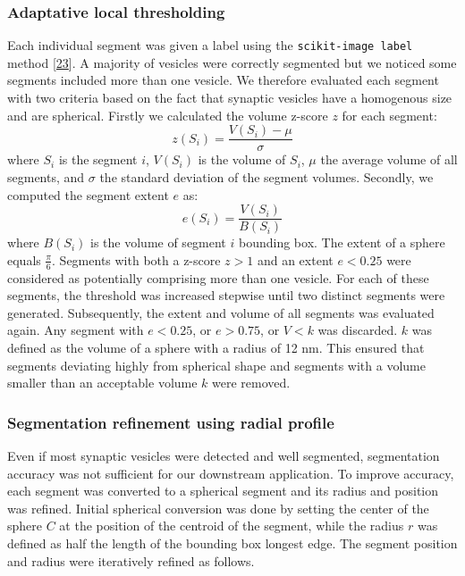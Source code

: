 \hypertarget{adaptative-local-thresholding}{%
\subsubsection{Adaptative local thresholding}\label{adaptative-local-thresholding}}

Each individual segment was given a label using the \texttt{scikit-image\ label} method {[}\protect\hyperlink{ref-stvWEJeu}{23}{]}.
A majority of vesicles were correctly segmented but we noticed some segments included more than one vesicle.
We therefore evaluated each segment with two criteria based on the fact that synaptic vesicles have a homogenous size and are spherical.
Firstly we calculated the volume z-score \(z\) for each segment:
\begin{equation}z(S_i) = \frac{V(S_i) - \mu}{\sigma}\label{eq:z-score-volume}\end{equation}
where \(S_i\) is the segment \(i\), \(V(S_i)\) is the volume of \(S_i\), \(\mu\) the average volume of all segments, and \(\sigma\) the standard deviation of the segment volumes.
Secondly, we computed the segment extent \(e\) as:
\begin{equation}e(S_i) = \frac{V(S_i)}{B(S_i)}\label{eq:extent}\end{equation}
where \(B(S_i)\) is the volume of segment \(i\) bounding box.
The extent of a sphere equals \(\frac{\pi}{6}\).
Segments with both a z-score \(z > 1\) and an extent \(e < 0.25\) were considered as potentially comprising more than one vesicle.
For each of these segments, the threshold was increased stepwise until two distinct segments were generated.
Subsequently, the extent and volume of all segments was evaluated again. Any segment with \(e < 0.25\), or \(e > 0.75\), or \(V < k\) was discarded.
\(k\) was defined as the volume of a sphere with a radius of 12 nm.
This ensured that segments deviating highly from spherical shape and segments with a volume smaller than an acceptable volume \(k\) were removed.

\hypertarget{segmentation-refinement-using-radial-profile}{%
\subsubsection{Segmentation refinement using radial profile}\label{segmentation-refinement-using-radial-profile}}

Even if most synaptic vesicles were detected and well segmented, segmentation accuracy was not sufficient for our downstream application.
To improve accuracy, each segment was converted to a spherical segment and its radius and position was refined.
Initial spherical conversion was done by setting the center of the sphere \(C\) at the position of the centroid of the segment, while the radius \(r\) was defined as half the length of the bounding box longest edge.
The segment position and radius were iteratively refined as follows.

